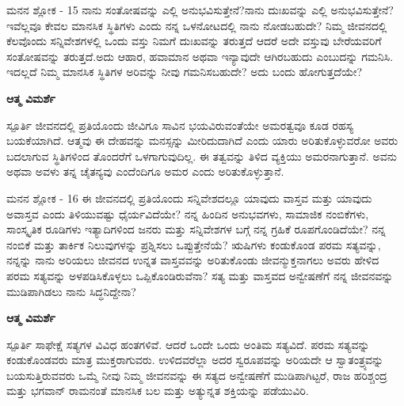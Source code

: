 \begin{mananam}{\kanfont ಮನನ ಶ್ಲೋಕ - \textenglish{15}}
\footnotesize \mananamfont ನಾನು ಸಂತೋಷವನ್ನು ಎಲ್ಲಿ ಅನುಭವಿಸುತ್ತೇನೆ?ನಾನು ದುಃಖವನ್ನು ಎಲ್ಲಿ ಅನುಭವಿಸುತ್ತೇನೆ? ಇವೆಲ್ಲವೂ ಕೇವಲ ಮಾನಸಿಕ ಸ್ಥಿತಿಗಳು ಎಂದು ನನ್ನ ಒಳನೋಟದಲ್ಲಿ ನಾನು ನೋಡಬಹುದೇ? ನಿಮ್ಮ ಜೀವನದಲ್ಲಿ ಕೆಲವೊಂದು ಸನ್ನಿವೇಶಗಳಲ್ಲಿ ಒಂದು ವಸ್ತು ನಿಮಗೆ ದುಃಖವನ್ನು ತರುತ್ತದೆ ಆದರೆ ಅದೇ ವಸ್ತುವು ಬೇರೆಯವರಿಗೆ ಸಂತೋಷವನ್ನು ತರುತ್ತದೆ.ಅದು ಆಹಾರ, ಹವಾಮಾನ ಅಥವಾ ಇನ್ಯಾವುದೇ ಆಗಿರಬಹುದು ಎಂಬುದನ್ನು ಗಮನಿಸಿ. ಇದಲ್ಲದೆ ನಿಮ್ಮ ಮಾನಸಿಕ ಸ್ಥಿತಿಗಳ ಅರಿವನ್ನು ನೀವು ಗಮನಿಸಬಹುದೇ? ಅದು ಬಂದು ಹೋಗುತ್ತದೆಯೇ?
\end{mananam}
\WritingHand\enspace\textbf{ಆತ್ಮ ವಿಮರ್ಶೆ}
\begin{inspiration}{\kanfont ಸ್ಪೂರ್ತಿ}
\footnotesize \mananamfont ಜೀವನದಲ್ಲಿ ಪ್ರತಿಯೊಂದು ಜೀವಿಗೂ ಸಾವಿನ ಭಯವಿರುವಂತೆಯೇ ಅಮರತ್ವವೂ ಕೂಡ ರಹಸ್ಯ ಬಯಕೆಯಾಗಿದೆ. ಆತ್ಮವು ಈ ದೇಹವನ್ನು ಮನಸ್ಸನ್ನು ಮೀರಿದುದಾಗಿದೆ ಎಂದು ಯಾರು ಅರಿತುಕೊಳ್ಳುವರೋ ಅವರು ಬದಲಾಗುವ ಸ್ಥಿತಿಗಳಿಂದ ತೊಂದರೆಗೆ ಒಳಗಾಗುವುದಿಲ್ಲ. ಈ ತತ್ವವನ್ನು ತಿಳಿದ ವ್ಯಕ್ತಿಯು ಅಮರನಾಗುತ್ತಾನೆ. ಅವನು ಅಥವಾ ಅವಳು ತನ್ನ ಚೈತನ್ಯವು ಎಂದೆಂದಿಗೂ ಅಮರ ಎಂದು ಅರಿತುಕೊಳ್ಳುತ್ತಾನೆ.
\end{inspiration}

\newpage
\begin{mananam}{\kanfont ಮನನ ಶ್ಲೋಕ - \textenglish{16}}
\footnotesize \mananamfont ಈ ಜೀವನದಲ್ಲಿ ಪ್ರತಿಯೊಂದು ಸನ್ನಿವೇಶದಲ್ಲೂ ಯಾವುದು ವಾಸ್ತವ ಮತ್ತು ಯಾವುದು ಅವಾಸ್ತವ ಎಂದು ತಿಳಿಯುವಷ್ಟು ಧೈರ್ಯವಿದೆಯೇ? ನನ್ನ ಹಿಂದಿನ ಅನುಭವಗಳು, ಸಾಮಾಜಿಕ ನಂಬಿಕೆಗಳು, ಸಾಂಸ್ಕೃತಿಕ ರೂಡಿಗಳು ಇತ್ಯಾದಿಗಳಿಂದ ಜನರು ಮತ್ತು ಸನ್ನಿವೇಶಗಳ ಬಗ್ಗೆ ನನ್ನ ಗ್ರಹಿಕೆ ರೂಪಗೊಂಡಿದೆಯೇ? ನನ್ನ ನಂಬಿಕೆ ಮತ್ತು ತಾರ್ಕಿಕ ನಿಲುವುಗಳನ್ನು ಪ್ರಶ್ನಿಸಲು ಒಪ್ಪುತ್ತೇನೆಯೆ? ಋಷಿಗಳು ಕಂಡುಕೊಂಡ ಪರಮ ಸತ್ಯವನ್ನು, ನನ್ನನ್ನು ನಾನು ಅರಿಯಲು ಜೀವನದ ಉನ್ನತ ವಾಸ್ತವವನ್ನು ಅರಿತುಕೊಂಡು ಜೀವನ್ಮುಕ್ತನಾಗಲು ಅವರು ಹೇಳಿದ ಪರಮ ಸತ್ಯವನ್ನು ಅಳಪಡಿಸಿಕೊಳ್ಳಲು ಒಪ್ಪಿಕೊಂಡಿರುವೆನಾ? ಸತ್ಯ ಮತ್ತು ವಾಸ್ತವದ ಅನ್ವೇಷಣೆಗೆ ನನ್ನ ಜೀವನವನ್ನು ಮುಡಿಪಾಗಿಡಲು ನಾನು ಸಿದ್ಧನಿದ್ದೇನಾ?
\end{mananam}
\WritingHand\enspace\textbf{ಆತ್ಮ ವಿಮರ್ಶೆ}
\begin{inspiration}{\kanfont ಸ್ಪೂರ್ತಿ}
\footnotesize \mananamfont ಸಾಫೇಕ್ಷೆ ಸತ್ಯಗಳ ವಿವಿಧ ಹಂತಗಳಿವೆ. ಆದರೆ ಒಂದೇ ಒಂದು ಅಂತಿಮ ಸತ್ಯವಿದೆ. ಪರಮ ಸತ್ಯವನ್ನು ಕಂಡುಕೊಂಡವರು ಮಾತ್ರ ಮುಕ್ತರಾಗುವರು. ಉಳಿದವರೆಲ್ಲಾ ಅದರ ಸ್ವರೂಪವನ್ನು ಅರಿಯದೇ ಆ ಸ್ವಾತಂತ್ರ್ಯವನ್ನು ಬಯಸುತ್ತಿರುವವರು ಒಮ್ಮೆ ನೀವು ನಿಮ್ಮ ಜೀವನವನ್ನು ಈ ಸತ್ಯದ ಅನ್ವೇಷಣೆಗೆ ಮುಡಿಪಾಗಿಟ್ಟರೆ, ರಾಜ ಹರಿಶ್ಚಂದ್ರ ಮತ್ತು ಭಗವಾನ್ ರಾಮನಂತೆ ಮಾನಸಿಕ ಬಲ ಮತ್ತು ಅತ್ಯುನ್ನತ ಶಕ್ತಿಯನ್ನು ಪಡೆಯುವಿರಿ.
\end{inspiration}
\newpage

